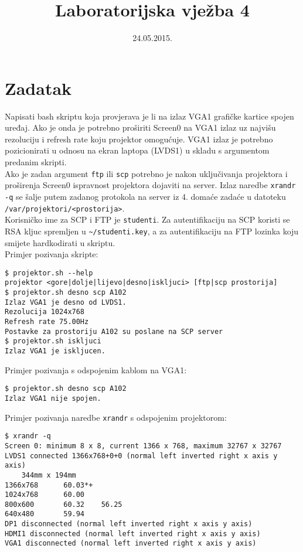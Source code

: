 \documentclass[12pt,a4paper]{article}
\begin{document}
	\title{Laboratorijska vježba 4}
	\date{\vspace{-5ex} 24.05.2015.}
	\maketitle

\section*{Zadatak}

Napisati bash skriptu koja provjerava je li na izlaz VGA1 grafičke kartice spojen uređaj. Ako je onda je potrebno proširiti Screen0 na VGA1 izlaz uz najvišu rezoluciju i refresh rate koju projektor omogućuje. VGA1 izlaz je potrebno pozicionirati u odnosu na ekran laptopa (LVDS1) u skladu s argumentom predanim skripti.\\

Ako je zadan argument \texttt{ftp} ili \texttt{scp} potrebno je nakon uključivanja projektora i proširenja Screen0 ispravnost projektora dojaviti na server. Izlaz naredbe \texttt{xrandr -q} se šalje putem zadanog protokola na server iz 4. domaće zadaće u datoteku \texttt{/var/projektori/<prostorija>}.\\
Korisničko ime za SCP i FTP je \texttt{studenti}. Za autentifikaciju na SCP koristi se RSA kljuc spremljen u \texttt{\textasciitilde/studenti.key}, a za autentifikaciju na FTP lozinka koju smijete hardkodirati u skriptu.\\

Primjer pozivanja skripte:
	\begin{verbatim}
$ projektor.sh --help
projektor <gore|dolje|lijevo|desno|iskljuci> [ftp|scp prostorija]
$ projektor.sh desno scp A102
Izlaz VGA1 je desno od LVDS1.
Rezolucija 1024x768
Refresh rate 75.00Hz
Postavke za prostoriju A102 su poslane na SCP server
$ projektor.sh iskljuci
Izlaz VGA1 je iskljucen.
	\end{verbatim}

Primjer pozivanja s odspojenim kablom na VGA1:
	\begin{verbatim}
$ projektor.sh desno scp A102
Izlaz VGA1 nije spojen.
	\end{verbatim}


\vspace{1em}

Primjer pozivanja naredbe \texttt{xrandr} s odspojenim projektorom:
	\begin{verbatim}
$ xrandr -q
Screen 0: minimum 8 x 8, current 1366 x 768, maximum 32767 x 32767
LVDS1 connected 1366x768+0+0 (normal left inverted right x axis y axis)
    344mm x 194mm
1366x768      60.03*+
1024x768      60.00  
800x600       60.32    56.25  
640x480       59.94  
DP1 disconnected (normal left inverted right x axis y axis)
HDMI1 disconnected (normal left inverted right x axis y axis)
VGA1 disconnected (normal left inverted right x axis y axis)
	\end{verbatim}
\end{document}
